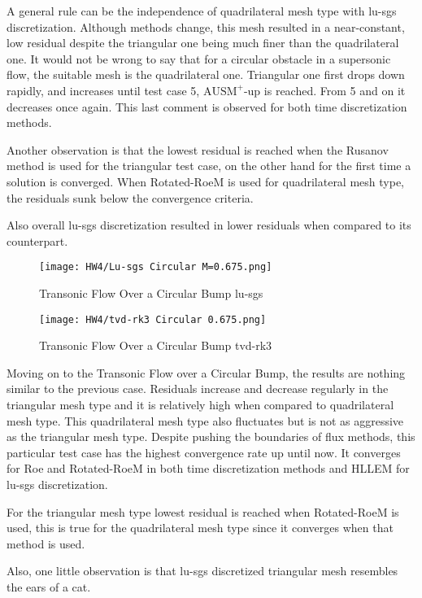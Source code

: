 \documentclass[a4paper, 12pt]{article}
\begin{document}
A general rule can be the independence of quadrilateral mesh type with lu-sgs discretization. Although methods change, this mesh resulted in a near-constant, low residual despite the triangular one being much finer than the quadrilateral one. It would not be wrong to say that for a circular obstacle in a supersonic flow, the suitable mesh is the quadrilateral one. Triangular one first drops down rapidly, and increases until test case 5, $\text{AUSM}^+\text{-up}$ is reached. From 5 and on it decreases once again. This last comment is observed for both time discretization methods.\\\par

Another observation is that the lowest residual is reached when the Rusanov method is used for the triangular test case, on the other hand for the first time a solution is converged. When Rotated-RoeM is used for quadrilateral mesh type, the residuals sunk below the convergence criteria.\\\par 
Also overall lu-sgs discretization resulted in lower residuals when compared to its counterpart.

\begin{figure}[H]
    \centering
    \texttt{[image: HW4/Lu-sgs Circular M=0.675.png]}
    \caption{Transonic Flow Over a Circular Bump lu-sgs}
\end{figure}
\begin{figure}[H]
    \centering
    \texttt{[image: HW4/tvd-rk3 Circular 0.675.png]}
    \caption{Transonic Flow Over a Circular Bump tvd-rk3}
\end{figure}
Moving on to the Transonic Flow over a Circular Bump, the results are nothing similar to the previous case. Residuals increase and decrease regularly in the triangular mesh type and it is relatively high when compared to quadrilateral mesh type. This quadrilateral mesh type also fluctuates but is not as aggressive as the triangular mesh type. Despite pushing the boundaries of flux methods, this particular test case has the highest convergence rate up until now. It converges for Roe and Rotated-RoeM in both time discretization methods and HLLEM for lu-sgs discretization.\\\par
For the triangular mesh type lowest residual is reached when Rotated-RoeM is used, this is true for the quadrilateral mesh type since it converges when that method is used.\\\par
Also, one little observation is that lu-sgs discretized triangular mesh resembles the ears of a cat.
\end{document}
